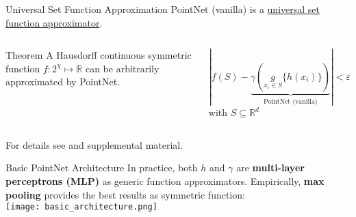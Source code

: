 \begin{frame}[c]{Universal Set Function Approximation}
    \large
    PointNet (vanilla) is a \underline{universal set function approximator}.

    \begin{columns}
        \begin{greenblock}{Theorem}
            A Hausdorff continuous symmetric function $f: 2^\chi \mapsto \mathbb{R}$ can be arbitrarily approximated by PointNet. \\
        \end{greenblock}
        \pause
        $$ \left| f(S) - \underbrace{ \gamma \left( \underset{x_i \in S}{g}\{h(x_i)\} \right)}_{\text{PointNet (vanilla)}} \right| < \varepsilon $$
        with $S \subseteq \mathbb{R}^d$ %
    \end{columns}
    \vspace{2em}
    For details see \cite{qi2017pointnet} and supplemental material.
\end{frame}


\begin{frame}[c]{Basic PointNet Architecture}
    \large
    In practice, both $h$ and $\gamma$ are \textbf{multi-layer perceptrons (MLP)} as generic function approximators.
    Empirically, \textbf{max pooling} provides the best results as symmetric function: \\
    \centering
    \texttt{[image: basic\_architecture.png]}
\end{frame}
